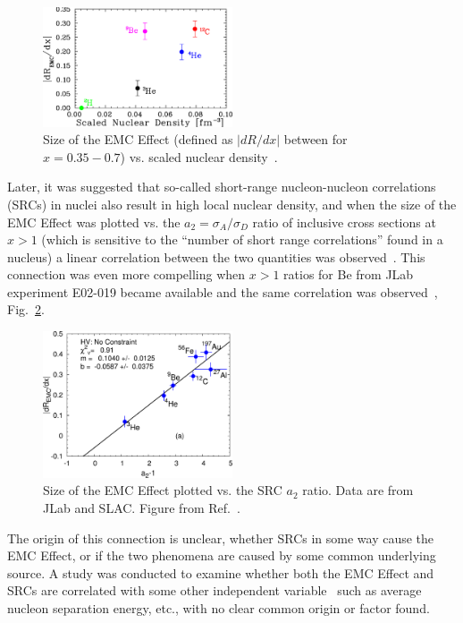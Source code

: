\begin{figure}[htb]
  \includegraphics[width=0.5\textwidth]{plots/e03103_slopes.pdf}
  \caption{Size of the EMC Effect (defined as $|dR/dx|$ between for $x=0.35-0.7$) vs. scaled nuclear
    density~\cite{Seely:2009gt}.}
  \label{fig:emc_jlab_hallc}
\end{figure}

Later, it was suggested that so-called short-range nucleon-nucleon correlations (SRCs) in nuclei also result
in high local nuclear density, and when the size of the EMC Effect was plotted vs. the
$a_2=\sigma_A/\sigma_D$ ratio of
inclusive cross sections at $x>1$ (which is sensitive to the ``number of short range correlations''
found in a nucleus) a linear correlation between the two quantities was observed~\cite{Weinstein:2010rt}.
This connection was even more compelling when $x>1$ ratios for Be from JLab experiment E02-019 became
available and the same correlation was observed~\cite{Hen:2012fm}, Fig.~\ref{fig:emc_src_bff}.

\begin{figure}[htb]
  \includegraphics[width=0.5\textwidth]{plots/plotfit_all_norescaling_nocm_rean_final.pdf}
  \caption{Size of the EMC Effect plotted vs. the SRC $a_2$ ratio. Data are from JLab and SLAC. Figure
  from Ref.~\cite{Arrington:2012ax}.}
  \label{fig:emc_src_bff}
\end{figure}

The origin of this connection is unclear, whether SRCs in some way cause the EMC Effect, or if the two
phenomena are caused by some common underlying source.  A study was conducted to examine whether
both the EMC Effect and SRCs are correlated with some other independent variable~\cite{Arrington:2012ax} such
as average nucleon separation energy, etc., with no clear common origin or factor found.
